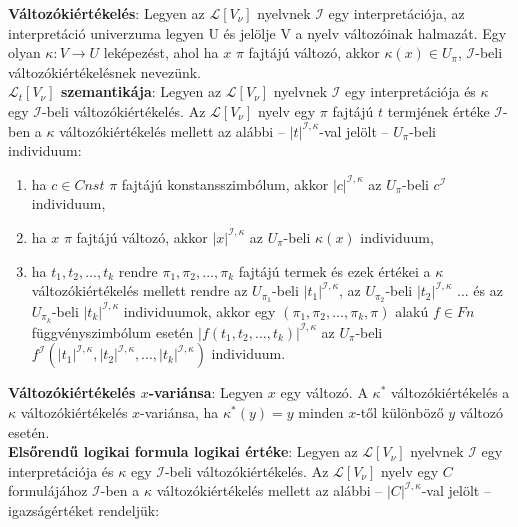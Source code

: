 \documentclass[margin=0px]{article}
\begin{document}
\noindent \textbf{Változókiértékelés}: Legyen az $\mathcal{L}[V_{\nu}]$ nyelvnek $\mathcal{I}$ egy interpretációja,
az interpretáció univerzuma legyen U és jelölje V a nyelv változóinak halmazát. Egy olyan $\kappa : V \to U$ leképezést,
ahol ha $x$ $\pi$ fajtájú változó, akkor $\kappa(x) \in U_{\pi}$, $\mathcal{I}$-beli változókiértékelésnek nevezünk.\\

\noindent \textbf{$\mathcal{L}_{t}[V_{\nu}]$ szemantikája}:
Legyen az $\mathcal{L}[V_{\nu}]$ nyelvnek $\mathcal{I}$ egy interpretációja és $\kappa$ egy $\mathcal{I}$-beli
változókiértékelés. Az $\mathcal{L}[V_{\nu}]$ nyelv egy $\pi$ fajtájú $t$ termjének értéke $\mathcal{I}$-ben
a $\kappa$ változókiértékelés mellett az alábbi -- $|t|^{\mathcal{I},\kappa}$-val jelölt -- $U_{\pi}$-beli
individuum:

\begin{enumerate}
    \item	ha $c \in Cnst$ $\pi$ fajtájú konstansszimbólum, akkor $|c|^{\mathcal{I},\kappa}$ az $U_{\pi}$-beli
          $c^{\mathcal{I}}$ individuum,

    \item	ha $x$ $\pi$ fajtájú változó, akkor $|x|^{\mathcal{I},\kappa}$ az $U_{\pi}$-beli $\kappa(x)$ individuum,

    \item	ha $t_{1}, t_{2}, ..., t_{k}$ rendre $\pi_{1}, \pi_{2}, ..., \pi_{k}$ fajtájú termek és ezek értékei
          a $\kappa$ változókiértékelés mellett rendre az $U_{\pi_{1}}$-beli $|t_{1}|^{\mathcal{I},\kappa}$, az
          $U_{\pi_{2}}$-beli $|t_{2}|^{\mathcal{I},\kappa}$ ... és az $U_{\pi_{k}}$-beli $|t_{k}|^{\mathcal{I},\kappa}$
          individuumok, akkor egy $(\pi_{1}, \pi_{2}, ..., \pi_{k}, \pi)$ alakú $f \in Fn$ függvényszimbólum esetén
          $|f(t_{1}, t_{2}, ..., t_{k})|^{\mathcal{I},\kappa}$ az $U_{\pi}$-beli
          $f^{\mathcal{I}}(|t_{1}|^{\mathcal{I},\kappa}, |t_{2}|^{\mathcal{I},\kappa}, ..., |t_{k}|^{\mathcal{I},\kappa})$
          individuum.

\end{enumerate}

\noindent \textbf{Változókiértékelés $x$-variánsa}: Legyen $x$ egy változó. A $\kappa^{*}$ változókiértékelés a
$\kappa$ változókiértékelés $x$-variánsa, ha $\kappa^{*}(y) = y$ minden $x$-től különböző $y$ változó esetén.\\

\noindent \textbf{Elsőrendű logikai formula logikai értéke}:
Legyen az $\mathcal{L}[V_{\nu}]$ nyelvnek $\mathcal{I}$ egy interpretációja és $\kappa$ egy $\mathcal{I}$-beli
változókiértékelés. Az $\mathcal{L}[V_{\nu}]$ nyelv egy $C$ formulájához $\mathcal{I}$-ben a $\kappa$ változókiértékelés
mellett az alábbi -- $|C|^{\mathcal{I},\kappa}$-val jelölt -- igazságértéket rendeljük:
\end{document}
